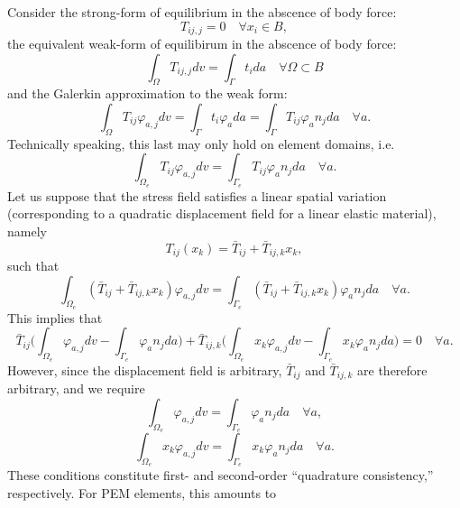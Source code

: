 \documentclass[11pt]{article} %
\begin{document}
Consider the strong-form of equilibrium in the abscence of body force:
\begin{equation}
	T_{ij,j} = 0 \quad \forall x_i \in B,
\end{equation}
the equivalent weak-form of equilibirum in the abscence of body force:
\begin{equation}
	\int_{\Omega} T_{ij,j} dv = \int_{\Gamma} t_i da \quad \forall \Omega \subset B
\end{equation}
and the Galerkin approximation to the weak form:
\begin{equation}
	\int_{\Omega} T_{ij} \varphi_{a,j} dv = \int_{\Gamma} t_i \varphi_a da = \int_{\Gamma} T_{ij} \varphi_a n_j da \quad \forall a.
\end{equation}
Technically speaking, this last may only hold on element domains, i.e.
\begin{equation}
	\int_{\Omega_e} T_{ij} \varphi_{a,j} dv = \int_{\Gamma_e} T_{ij} \varphi_a n_j da \quad \forall a.
\end{equation}
Let us suppose that the stress field satisfies a linear spatial variation (corresponding to a quadratic displacement field for a linear elastic material), namely
\begin{equation}
	T_{ij} (x_k) = \bar{T}_{ij} + \bar{T}_{ij,k} x_k,
\end{equation}
such that
\begin{equation}
	\int_{\Omega_e} (\bar{T}_{ij} + \bar{T}_{ij,k} x_k) \varphi_{a,j} dv = \int_{\Gamma_e} (\bar{T}_{ij} + \bar{T}_{ij,k} x_k) \varphi_a n_j da \quad \forall a.
\end{equation}
This implies that
\begin{equation}
	\bar{T}_{ij} \bigg(\int_{\Omega_e} \varphi_{a,j} dv - \int_{\Gamma_e} \varphi_a n_j da \bigg) + \bar{T}_{ij,k} \bigg( \int_{\Omega_e} x_k \varphi_{a,j} dv - \int_{\Gamma_e} x_k \varphi_a n_j da \bigg) = 0  \quad \forall a.
\end{equation}
However, since the displacement field is arbitrary, $\bar{T}_{ij}$ and $\bar{T}_{ij,k}$ are therefore arbitrary, and we require
\begin{equation}
	\int_{\Omega_e} \varphi_{a,j} dv = \int_{\Gamma_e} \varphi_a n_j da \quad \forall a,
\end{equation}
\begin{equation}
	\int_{\Omega_e} x_k \varphi_{a,j} dv = \int_{\Gamma_e} x_k \varphi_a n_j da \quad \forall a.
\end{equation}
These conditions constitute first- and second-order ``quadrature consistency,'' respectively. For PEM elements, this amounts to
\end{document}

